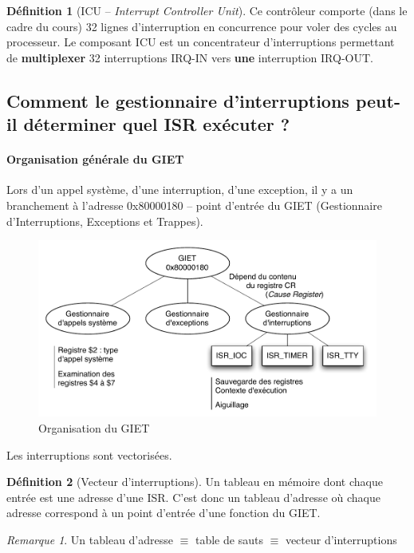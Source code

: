 \documentclass[11pt,english,french]{scrreprt}
\theoremstyle{remark}
\newtheorem*{rem*}{Remarque}
\theoremstyle{definition}
\newtheorem*{def*}{Définition}
\begin{document}
\begin{def*}[ICU -- \emph{Interrupt Controller Unit}]
	Ce contrôleur comporte (dans le cadre du cours) 32 lignes d'interruption en concurrence pour voler des cycles au processeur. Le composant ICU est un concentrateur d'interruptions permettant de \textbf{multiplexer} 32 interruptions IRQ-IN vers \textbf{une} interruption IRQ-OUT.
\end{def*}

\subsection{Comment le gestionnaire d'interruptions peut-il déterminer quel ISR exécuter ?} %

\paragraph{Organisation générale du GIET} %

Lors d'un appel système, d'une interruption, d'une exception, il y a un branchement à l'adresse 0x80000180 -- point d'entrée du GIET (Gestionnaire d'Interruptions, Exceptions et Trappes).

\begin{figure}[!h]
	\center
	\includegraphics[scale=.5]{diagrammes/GIET}
	\caption{Organisation du GIET}
\end{figure}

Les interruptions sont vectorisées. 

\begin{def*}[Vecteur d'interruptions]
	Un tableau en mémoire dont chaque entrée est une adresse d'une ISR. C'est donc un tableau d'adresse où chaque adresse correspond à un point d'entrée d'une fonction du GIET.
\end{def*}

\begin{rem*}
	Un tableau d'adresse $\equiv$ table de sauts $\equiv$ vecteur d'interruptions
\end{rem*}
\end{document}
